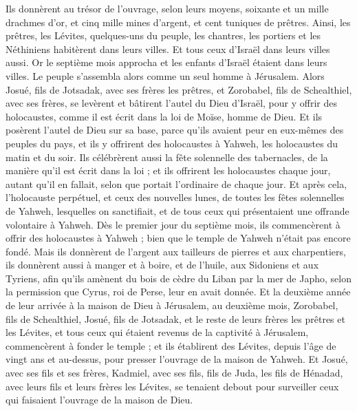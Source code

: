 \begin{multicols}{2}
Ils donnèrent au trésor de l'ouvrage, selon leurs moyens, soixante et un mille drachmes d'or, et cinq mille mines d'argent, et cent tuniques de prêtres.
Ainsi, les prêtres, les Lévites, quelques-uns du peuple, les chantres, les portiers et les Néthiniens habitèrent dans leurs villes. Et tous ceux d'Israël dans leurs villes aussi.
\VerseOne{}Or le septième mois approcha et les enfants d'Israël étaient dans leurs villes. Le peuple s'assembla alors comme un seul homme à Jérusalem.
Alors Josué, fils de Jotsadak, avec ses frères les prêtres, et Zorobabel, fils de Schealthiel, avec ses frères, se levèrent et bâtirent l'autel du Dieu d'Israël, pour y offrir des holocaustes, comme il est écrit dans la loi de Moïse, homme de Dieu.
Et ils posèrent l'autel de Dieu sur sa base, parce qu'ils avaient peur en eux-mêmes des peuples du pays, et ils y offrirent des holocaustes à Yahweh, les holocaustes du matin et du soir.
Ils célébrèrent aussi la fête solennelle des tabernacles, de la manière qu'il est écrit dans la loi ; et ils offrirent les holocaustes chaque jour, autant qu'il en fallait, selon que portait l'ordinaire de chaque jour.
Et après cela, l'holocauste perpétuel, et ceux des nouvelles lunes, de toutes les fêtes solennelles de Yahweh, lesquelles on sanctifiait, et de tous ceux qui présentaient une offrande volontaire à Yahweh.
Dès le premier jour du septième mois, ils commencèrent à offrir des holocaustes à Yahweh ; bien que le temple de Yahweh n'était pas encore fondé.
Mais ils donnèrent de l'argent aux tailleurs de pierres et aux charpentiers, ils donnèrent aussi à manger et à boire, et de l'huile, aux Sidoniens et aux Tyriens, afin qu'ils amènent du bois de cèdre du Liban par la mer de Japho, selon la permission que Cyrus, roi de Perse, leur en avait donnée.
Et la deuxième année de leur arrivée à la maison de Dieu à Jérusalem, au deuxième mois, Zorobabel, fils de Schealthiel, Josué, fils de Jotsadak, et le reste de leurs frères les prêtres et les Lévites, et tous ceux qui étaient revenus de la captivité à Jérusalem, commencèrent à fonder le temple ; et ils établirent des Lévites, depuis l'âge de vingt ans et au-dessus, pour presser l'ouvrage de la maison de Yahweh.
Et Josué, avec ses fils et ses frères, Kadmiel, avec ses fils, fils de Juda, les fils de Hénadad, avec leurs fils et leurs frères les Lévites, se tenaient debout pour surveiller ceux qui faisaient l'ouvrage de la maison de Dieu.

\end{multicols}
